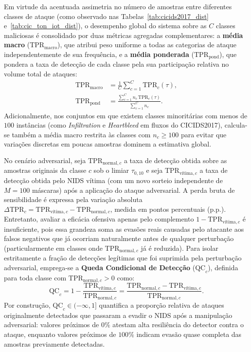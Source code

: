 \documentclass[conference]{IEEEtran}
\begin{document}
Em virtude da acentuada assimetria no número de amostras entre diferentes classes de ataque (como observado nas Tabelas~\ref{tab:cicids2017_dist} e~\ref{tab:cic_ton_iot_dist}), o desempenho global do sistema sobre as $C$ classes maliciosas é consolidado por duas métricas agregadas complementares: a \textbf{média macro} ($\text{TPR}_{\text{macro}}$), que atribui peso uniforme a todas as categorias de ataque independentemente de sua frequência, e a \textbf{média ponderada} ($\text{TPR}_{\text{pond}}$), que pondera a taxa de detecção de cada classe pela sua participação relativa no volume total de ataques:
\begin{equation}
\begin{aligned}
\text{TPR}_{\text{macro}} &= \frac{1}{C} \sum_{c=1}^{C} \text{TPR}_c(\tau), \\
\text{TPR}_{\text{pond}} &= \frac{\sum_{c=1}^{C} n_c \, \text{TPR}_c(\tau)}{\sum_{c=1}^{C} n_c}.
\end{aligned}
\label{eq:tpr_aggregates}
\end{equation}
Adicionalmente, nos conjuntos em que existem classes minoritárias com menos de $100$ instâncias (como \textit{Infiltration} e \textit{Heartbleed} em fluxos do CICIDS2017), calcula-se também a média macro restrita às classes com $n_c \ge 100$ para evitar que variações discretas em poucas amostras dominem a estimativa global.

No cenário adversarial, seja $\text{TPR}_{\text{normal}, c}$ a taxa de detecção obtida sobre as amostras originais da classe $c$ sob o limiar $\tau_{0{,}10}$ e seja $\text{TPR}_{\text{vítima}, c}$ a taxa de detecção obtida pelo NIDS vítima (com um novo sorteio independente de $M = 100$ máscaras) após a aplicação do ataque adversarial.
A perda bruta de sensibilidade é expressa pela variação absoluta $\Delta\text{TPR}_c = \text{TPR}_{\text{vítima}, c} - \text{TPR}_{\text{normal}, c}$, medida em pontos percentuais (p.p.).
Entretanto, avaliar a eficácia ofensiva apenas pelo complemento $1 - \text{TPR}_{\text{vítima}, c}$ é insuficiente, pois essa grandeza soma as evasões reais causadas pelo atacante aos falsos negativos que já ocorriam naturalmente antes de qualquer perturbação (particularmente em classes onde $\text{TPR}_{\text{normal}, c}$ já é reduzida).
Para isolar estritamente a fração de detecções legítimas que foi suprimida pela perturbação adversarial, emprega-se a \textbf{Queda Condicional de Detecção} ($\text{QC}_c$), definida para toda classe com $\text{TPR}_{\text{normal}, c} > 0$ como:
\begin{equation}
\text{QC}_c = 1 - \frac{\text{TPR}_{\text{vítima}, c}}{\text{TPR}_{\text{normal}, c}} = \frac{\text{TPR}_{\text{normal}, c} - \text{TPR}_{\text{vítima}, c}}{\text{TPR}_{\text{normal}, c}}.
\label{eq:queda_condicional}
\end{equation}
Por construção, $\text{QC}_c \in (-\infty, 1]$ quantifica a proporção relativa de ataques originalmente detectados que passaram a evadir o NIDS após a manipulação adversarial: valores próximos de $0\%$ atestam alta resiliência do detector contra o ataque, enquanto valores próximos de $100\%$ indicam evasão quase completa das amostras previamente detectadas.
\end{document}
